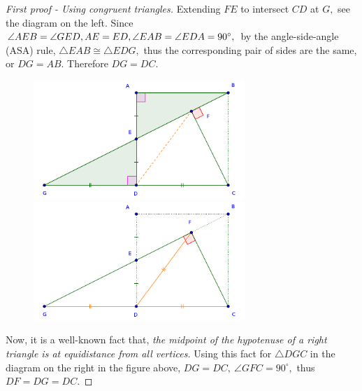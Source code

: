 \documentclass{article}
\begin{document}
\begin{proof}[First proof - Using congruent triangles]
    Extending $FE$ to intersect $CD$ at $G,$ see the diagram on the left. 
    Since $\angle AEB = \angle GED, AE = ED, \angle EAB = \angle EDA = 90^\circ,$
    by the angle-side-angle (ASA) rule, $\triangle EAB \cong \triangle EDG,$
    thus the corresponding pair of sides are the same, or $DG=AB$. Therefore $DG=DC.$

    \begin{figure}[h]
        \centering
        \begin{minipage}[t]{8cm}
            \centering
            \includegraphics[width=8cm]{./svg/pdf/2022-2-ms-1-1-a.pdf}
        \end{minipage}
        \quad
        \begin{minipage}[t]{8cm}
            \centering
            \includegraphics[width=8cm]{./svg/pdf/2022-2-ms-1-1-b.pdf}
        \end{minipage}
    \end{figure}

    Now, it is a well-known fact that,
    \textit{the midpoint of the hypotenuse of a right triangle is at equidistance from all vertices.}
    Using this fact for $\triangle DGC$ in the diagram on the right in the figure above,
    $DG=DC,\ \angle{GFC} = 90^\circ,$ thus $DF=DG=DC.$
\end{proof}

\newpage
\end{document}
